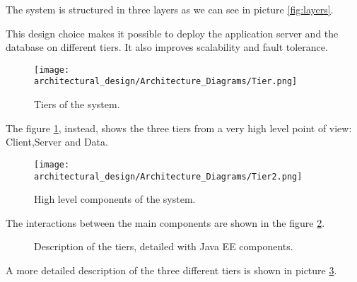 The system is structured in three layers as we can see in picture \ref{fig:layers}.

This design choice makes it possible to deploy the application server and the database on different tiers. It also improves scalability and fault tolerance.

\begin{figure}
	\centering
	\texttt{[image: architectural\_design/Architecture\_Diagrams/Tier.png]}
	\caption{Tiers of the system.}
	\label{fig:tiers}
\end{figure}

The figure \ref{fig:tiers}, instead, shows the three tiers from a very high level point of view: Client,Server and Data.

\begin{figure}
	\centering
	\texttt{[image: architectural\_design/Architecture\_Diagrams/Tier2.png]}
	\caption{High level components of the system.}
	\label{fig:high_components}
\end{figure}

The interactions between the main components are shown in the figure \ref{fig:high_components}.

\begin{figure}
    \vspace*{-2cm}
    \caption{Description of the tiers, detailed with Java EE components.}
	\label{fig:tiers_description}
\end{figure}

A more detailed description of the three different tiers is shown in picture \ref{fig:tiers_description}.


